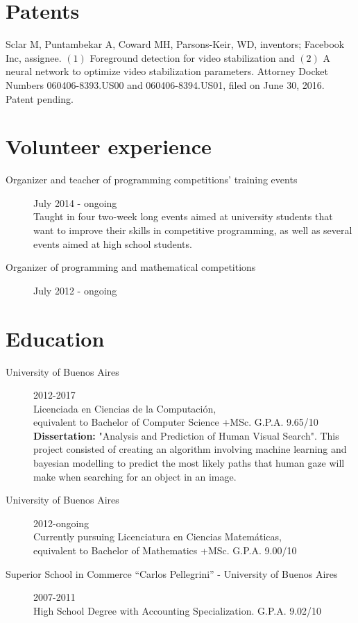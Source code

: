 \documentclass [a4paper, 11pt]{article}
\begin{document}
\section* {Patents}
Sclar M, Puntambekar A, Coward MH, Parsons-Keir, WD, inventors; Facebook Inc,
assignee. $(1)$ Foreground detection for video stabilization and $(2)$ A neural network to optimize video stabilization parameters. Attorney Docket Numbers 060406-8393.US00 and 060406-8394.US01, filed on June 30, 2016. Patent pending.

\section* {Volunteer experience}
\begin{description}
\item[Organizer and teacher of programming competitions' training events] {\hfill July 2014 - ongoing \\
  Taught in four two-week long events aimed at university students that 
  want to improve their skills in competitive programming, as well as 
  several events aimed at high school students. 
}
\item[Organizer of programming and mathematical competitions] { \hfill July 2012 - ongoing \\
}
\end{description}

\section* {Education}
\begin{description}
  \item[University of Buenos Aires]{\hfill 2012-2017 \\
	Licenciada en Ciencias de la Computaci\'on, \\
	equivalent to Bachelor of Computer Science +MSc. G.P.A. 9.65/10 \\
    
    \textbf{Dissertation:} "Analysis and Prediction of Human Visual Search". This project consisted of creating an algorithm involving machine learning and bayesian modelling to predict the most likely paths that human gaze will make when searching for an object in an image.}
  \item[University of Buenos Aires]{\hfill 2012-ongoing \\ 
	Currently pursuing Licenciatura en Ciencias Matem\'aticas, \\
	equivalent to Bachelor of Mathematics +MSc. G.P.A. 9.00/10}
	
  \item[Superior School in Commerce ``Carlos Pellegrini'' - University of Buenos Aires] {\hfill 2007-2011 \\
	High School Degree with Accounting Specialization. G.P.A. 9.02/10}
\end{description}
\end{document}
